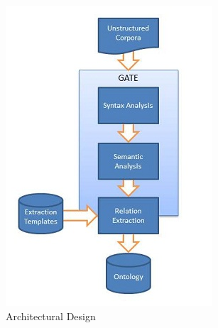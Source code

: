 %
%
%                 
\label{sec:appendixb}

\begin{figure}[h]                %
   \centering                    %
   \includegraphics{archidesign.jpg}      %
   \caption{Architectural Design}
    \label{fig:archidesign}
\end{figure}

